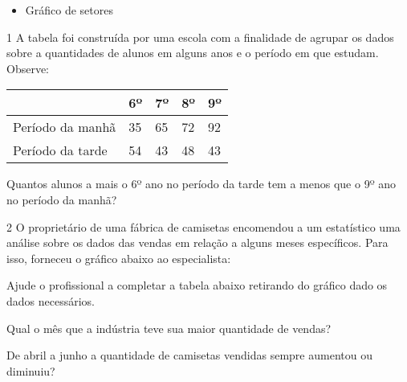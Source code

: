 {{\begin{itemize}
\item
  Gráfico de setores
\end{itemize}

}


\num{1} A tabela foi construída por uma escola com a finalidade de agrupar
os dados sobre a quantidades de alunos em alguns anos e o período em que
estudam. Observe:

\begin{longtable}[]{@{}lllll@{}}
\toprule
& 6º & 7º & 8º & 9º\tabularnewline
\midrule
\endhead
Período da manhã & 35 & 65 & 72 & 92\tabularnewline
Período da tarde & 54 & 43 & 48 & 43\tabularnewline
\bottomrule
\end{longtable}

Quantos alunos a mais o 6º ano no período da tarde tem a menos que o 9º
ano no período da manhã?



\num{2} O proprietário de uma fábrica de camisetas encomendou a um
estatístico uma análise sobre os dados das vendas em relação a alguns
meses específicos. Para isso, forneceu o gráfico abaixo ao especialista:


\begin{escolha}
\item
  Ajude o profissional a completar a tabela abaixo retirando do gráfico
  dado os dados necessários.


\item
  Qual o mês que a indústria teve sua maior quantidade de vendas?


\item
  De abril a junho a quantidade de camisetas vendidas sempre aumentou ou
  diminuiu?



\end{escolha}}
